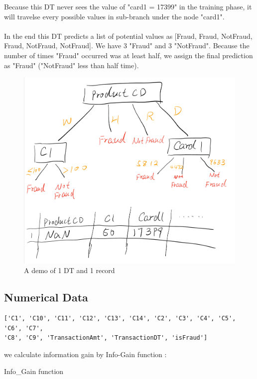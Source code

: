 \documentclass{article}
\begin{document}
Because this DT never sees the value of "card1 = 17399" in the training phase, it will travelse every possible values in sub-branch under the node "card1". \\\\
In the end this DT predicts a list of potential values as [Fraud, Fraud, NotFraud, Fraud, NotFraud, NotFraud]. We have 3 "Fraud" and 3 "NotFraud". Because the number of times "Fraud" occurred was at least half, we assign the final prediction as "Fraud" ("NotFraud" less than half time).

\begin{figure}[H]
  \centering
  \includegraphics[width=1\linewidth]{Fig/NaN_test.jpeg}
  \caption{\label{fig:1}A demo of 1 DT and 1 record}
\end{figure}


\subsection{Numerical Data}
\begin{verbatim}
['C1', 'C10', 'C11', 'C12', 'C13', 'C14', 'C2', 'C3', 'C4', 'C5', 'C6', 'C7', 
'C8', 'C9', 'TransactionAmt', 'TransactionDT', 'isFraud']
\end{verbatim}

we calculate information gain by Info-Gain function :

\begin{algorithm}[H]
\SetAlgoLined
{}



\caption{Info\_Gain function}
\end{algorithm}
\end{document}
